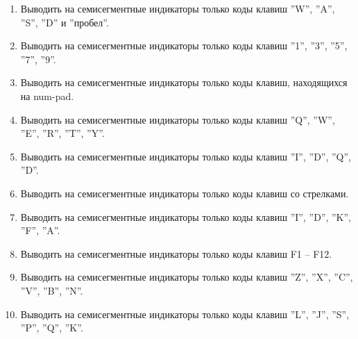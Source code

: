 \begin{enumerate}
  
  \setlength\itemsep{1em}

  \item{
  Выводить на семисегментные индикаторы только коды клавиш ''W'', ''A'', ''S'', ''D'' и ''пробел''.
  }

  \item{
  Выводить на семисегментные индикаторы только коды клавиш ''1'', ''3'', ''5'', ''7'', ''9''.
  }

  \item{
  Выводить на семисегментные индикаторы только коды клавиш, находящихся на num-pad.
  }

  \item{
  Выводить на семисегментные индикаторы только коды клавиш ''Q'', ''W'', ''E'', ''R'', ''T'', ''Y''.
  }

  \item{
  Выводить на семисегментные индикаторы только коды клавиш ''I'', ''D'', ''Q'', ''D''.
  }

  \item{
  Выводить на семисегментные индикаторы только коды клавиш со стрелками.
  }

  \item{
  Выводить на семисегментные индикаторы только коды клавиш ''I'', ''D'', ''K'', ''F'', ''A''.
  }

  \item{
  Выводить на семисегментные индикаторы только коды клавиш F1 -- F12.
  }

  \item{
  Выводить на семисегментные индикаторы только коды клавиш ''Z'', ''X'', ''C'', ''V'', ''B'', ''N''.
  }

  \item{
  Выводить на семисегментные индикаторы только коды клавиш ''L'', ''J'', ''S'', ''P'', ''Q'', ''K''.
  }

\end{enumerate}


